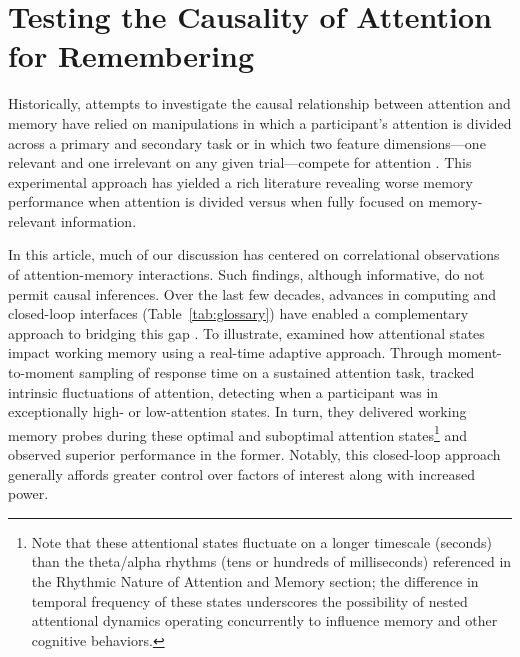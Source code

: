 \section{Testing the Causality of Attention for Remembering}
Historically, attempts to investigate the causal relationship between attention and memory have relied on manipulations in which a participant’s attention is divided across a primary and secondary task \parencite[e.g.,][]{baddeley1984attention,craik1996effects,murdock1965effects} or in which two feature dimensions—one relevant and one irrelevant on any given trial—compete for attention \parencite[e.g.,][]{uncapher2009selecting}. This experimental approach has yielded a rich literature revealing worse memory performance when attention is divided versus when fully focused on memory-relevant information.

In this article, much of our discussion has centered on correlational observations of attention-memory interactions. Such findings, although informative, do not permit causal inferences. Over the last few decades, advances in computing and closed-loop interfaces (Table~\ref{tab:glossary}) have enabled a complementary approach to bridging this gap \parencite[Fig.~\ref{fig:a2r-fig4}a; e.g.,][]{debettencourt2015closed,debettencourt2018forgetting,debettencourt2019realtime,keene2022pupillometry,salari2016dissociation,yoo2012when}. To illustrate, \textcite{debettencourt2019realtime} examined how attentional states impact working memory using a real-time adaptive approach. Through moment-to-moment sampling of response time on a sustained attention task, \textcite{debettencourt2019realtime} tracked intrinsic fluctuations of attention, detecting when a participant was in exceptionally high- or low-attention states. In turn, they delivered working memory probes during these optimal and suboptimal attention states\footnote{Note that these attentional states fluctuate on a longer timescale (seconds) than the theta/alpha rhythms (tens or hundreds of milliseconds) referenced in the Rhythmic Nature of Attention and Memory section; the difference in temporal frequency of these states underscores the possibility of nested attentional dynamics operating concurrently to influence memory and other cognitive behaviors.} and observed superior performance in the former. Notably, this closed-loop approach generally affords greater control over factors of interest along with increased power.


